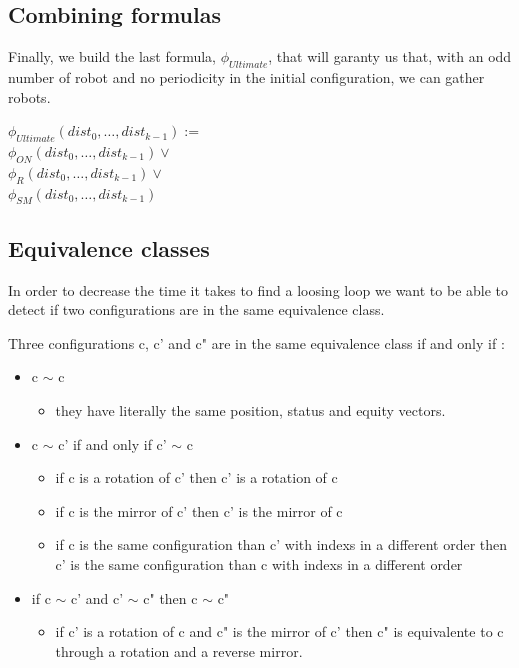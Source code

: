 \documentclass{article}
\begin{document}
\subsection{Combining formulas}

Finally, we build the last formula, $\phi_{Ultimate}$, that will garanty us that, with an odd number of robot and no periodicity in the initial configuration, we can gather robots.

\begin{center}
    
$\phi_{Ultimate}(dist_{0}, \ldots , dist_{k-1}):=$\\
$\phi_{ON}(dist_{0}, \ldots , dist_{k-1}) \lor$\\
$\phi_R(dist_{0}, \ldots , dist_{k-1}) \lor$\\
$\phi_{SM}(dist_{0}, \ldots , dist_{k-1})$
\end{center}

\subsection{Equivalence classes}

In order to decrease the time it takes to find a loosing loop we want to be able to detect if two configurations are in the same equivalence class.

Three configurations c, c' and c" are in the same equivalence class if and only if :
\begin{itemize}
    \item c $\sim$ c
    \begin{itemize}
        \item they have literally the same position, status and equity vectors.
    \end{itemize}
    \item c $\sim$ c' if and only if c' $\sim$ c
    \begin{itemize}
        \item if c is a rotation of c' then c' is a rotation of c
        \item if c is the mirror of c' then c' is the mirror of c
        \item if c is the same configuration than c' with indexs in a different order then c' is the same configuration than c with indexs in a different order
    \end{itemize}
    \item if c $\sim$ c' and c' $\sim$ c" then c $\sim$ c"
    \begin{itemize}
        \item if c' is a rotation of c and c" is the mirror of c' then c" is equivalente to c through a rotation and a reverse mirror.
    \end{itemize}
\end{itemize}
\end{document}

